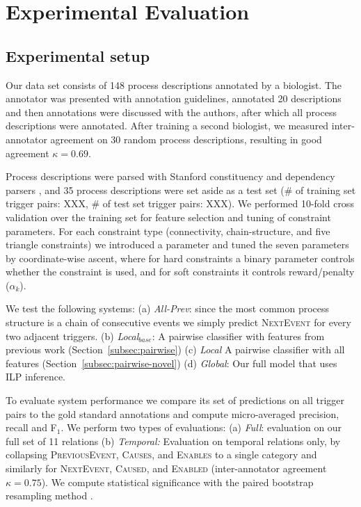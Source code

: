 \section{Experimental Evaluation}

\subsection{Experimental setup}

Our data set consists of 148 process descriptions annotated by a biologist. The annotator was presented with annotation guidelines, annotated 20 descriptions and then annotations were discussed with the authors, after which all process descriptions were annotated. After training a second biologist, we measured inter-annotator agreement on 30 random process descriptions, resulting in good agreement $\kappa=0.69$. 

Process descriptions were parsed with Stanford constituency and dependency parsers \cite{Klein03,Marneffe06}, and 35 process descriptions were set aside as a test set (\# of training set trigger pairs: XXX, \# of test set trigger pairs: XXX). We performed 10-fold cross validation over the training set for feature selection and tuning of constraint parameters. For each constraint type (connectivity, chain-structure, and five triangle constraints) we introduced a parameter and tuned the seven parameters by coordinate-wise ascent, where for hard constraints a binary parameter controls whether the constraint is used, and for soft constraints it controls reward/penalty ($\alpha_k$).

We test the following systems: (a) \emph{All-Prev}: since the most common process structure is a chain of consecutive events we simply predict \textsc{NextEvent} for every two adjacent triggers. (b) \emph{Local$_{base}$}: A pairwise classifier with features from previous work (Section~\ref{subsec:pairwise}) (c) \emph{Local} A pairwise classifier with all features (Section~\ref{subsec:pairwise-novel}) (d) \emph{Global}: Our full model that uses ILP inference.


To evaluate system performance we compare its set of predictions on all trigger pairs to the gold standard annotations and compute micro-averaged precision, recall and F$_1$. We perform two types of evaluations: (a) \emph{Full}: evaluation on our full set of 11 relations (b) \emph{Temporal:} Evaluation on temporal relations only, by collapsing \textsc{PreviousEvent}, \textsc{Causes}, and \textsc{Enables} to a single category and similarly for \textsc{NextEvent}, \textsc{Caused}, and \textsc{Enabled} (inter-annotator agreement $\kappa=0.75$). We compute statistical significance with the paired bootstrap resampling method \cite{efron1993}.

